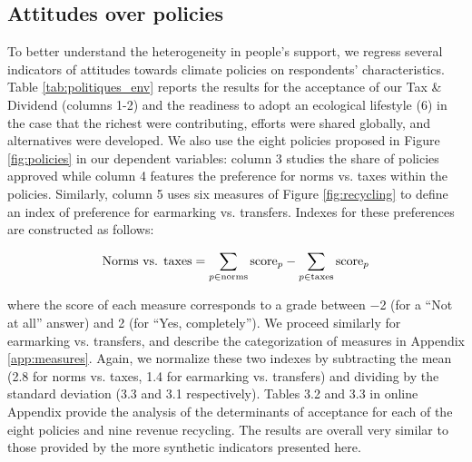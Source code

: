 \documentclass[english,5p,authoryear]{elsarticle}
\begin{document}
    \subsection{Attitudes over policies}\label{sec:determinants_attitudes_policies}

To better understand the heterogeneity in people's support, we regress several indicators of attitudes towards climate policies on respondents' characteristics. Table \ref{tab:politiques_env} reports the results for the acceptance of our Tax \& Dividend (columns 1-2) and the readiness to adopt an ecological lifestyle (6) in the case that the richest were contributing, efforts were shared globally, and alternatives were developed. We also use the eight policies proposed in Figure \ref{fig:policies} in our dependent variables: column 3 studies the share of policies approved while column 4 features the preference for norms vs. taxes within the policies. Similarly, column 5 uses six measures of Figure \ref{fig:recycling} to define an index of preference for earmarking vs. transfers. Indexes for these preferences are constructed as follows:

\begin{align}
\textnormal{Norms vs. taxes} = \sum_{p \in \textnormal{norms}} \textnormal{score}_{p} - \sum_{p \in \textnormal{taxes}}  \textnormal{score}_{p}
\label{eq:norms_vs_taxes}
\end{align}

\noindent
where the score of each measure corresponds to a grade between $-$2 (for a ``Not at all'' answer) and 2 (for ``Yes, completely''). We proceed similarly for earmarking vs. transfers, and describe the categorization of measures in Appendix \ref{app:measures}. Again, we normalize these two indexes by subtracting the mean (2.8 for norms vs. taxes, 1.4 for earmarking vs. transfers) and dividing by the standard deviation (3.3 and 3.1 respectively). Tables 3.2 and 3.3 in online Appendix provide the analysis of the determinants of acceptance for each of the eight policies and nine revenue recycling. The results are overall very similar to those provided by the more synthetic indicators presented here.

\end{document}
